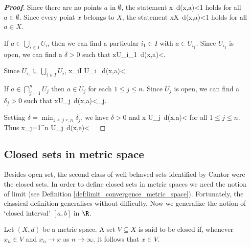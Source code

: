 \begin{proof}[\bf Proof]
\ben
\item [(i)] Since there are no points $a$ in $\emptyset$, the statement
\be
x\in \emptyset\quad {}\ d(x,a)<1
\ee
holds for all $a\in \emptyset$. Since every point $x$ belongs to $X$, the statement
\be
x\in X\quad {}\ d(x,a)<1
\ee
holds for all $a\in X$.

\item [(ii)] If $a\in \bigcup_{i\in I} U_i$, then we can find a particular $i_1\in I$ with $a\in U_{i_1}$. Since $U_{i_{1}}$ is open, we can find a $\delta>0$ such that
\be
x\in U_{i_{1}}\quad {}\ d(x,a)<\delta.
\ee

Since $U_{i_{1}}\subseteq \bigcup_{i\in I} U_i$,
\be
x\in \bigcup_{i\in I} U_i \quad {}\ d(x,a)<\delta \ \ra \ 
\ee

\item [(iii)] If $a\in \bigcap_{j=1}^{n} U_j$ then $a\in U_{j}$ for each $1\leq j\leq n$. Since $U_{j}$ is open, we can find a $\delta_{j}>0$ such that
\be
x\in U_{j}\quad {}\ d(x,a)<\delta_{j}.
\ee

Setting $\delta=\min_{1\leq j\leq n}\delta_{j}$, we have $\delta>0$ and
\be
x \in U_{j}\quad {}\ d(x,a)<\delta
\ee
for all $1\leq j\leq n$. Thus
\be
x\in \bigcap_{j=1}^{n} U_{j}\quad {}\ d(x,e)<\delta \ \ra\ 
\ee
\een
\end{proof}






\subsection{Closed sets in metric space}

Besides open set, the second class of well behaved sets identified by Cantor were the closed sets. In order to define closed sets in metric spaces we need the notion of limit (see Definition \ref{def:limit_convergence_metric_space}). Fortunately, the classical definition generalises without difficulty. Now we generalize the notion of `closed interval' $[a,b]$ in $\R$.

\begin{definition}\label{def:closed_set_metric_space}
Let $(X,d)$ be a metric space. A set $V\subseteq X$ is said to be closed if, whenever $x_{n}\in V$ and $x_{n}\to x$ as $n\to\infty$, it follows that $x\in V$.
\end{definition}

